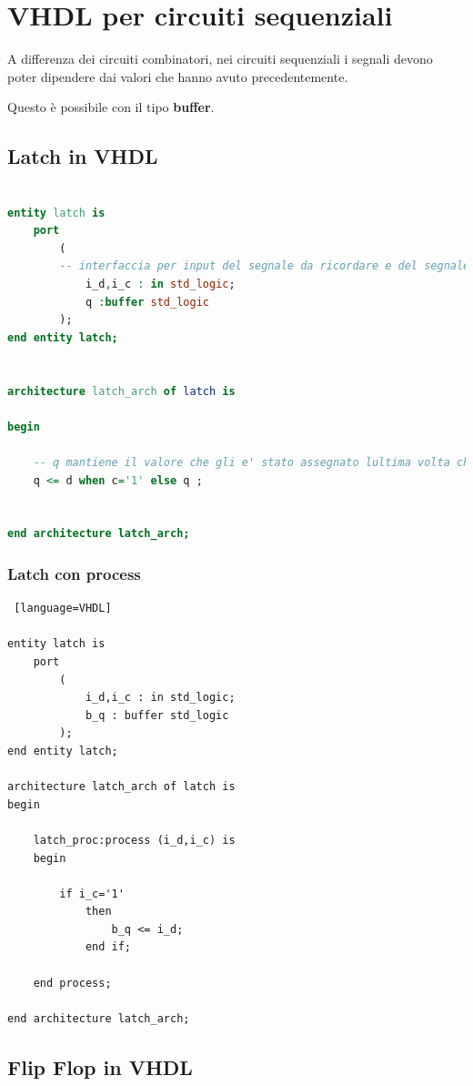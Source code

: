 \documentclass[a4paper]{book}
\begin{document}
\section{VHDL per circuiti sequenziali}

A differenza dei circuiti combinatori, nei circuiti sequenziali i segnali devono poter dipendere dai valori che hanno avuto precedentemente.

Questo è possibile con il tipo \textbf{buffer}.

\subsection*{Latch in VHDL}

\begin{lstlisting}[language=VHDL]

entity latch is
	port
		(
		-- interfaccia per input del segnale da ricordare e del segnale di clock
			i_d,i_c : in std_logic; 
			q :buffer std_logic
		);
end entity latch;


architecture latch_arch of latch is

begin
	
	-- q mantiene il valore che gli e' stato assegnato lultima volta che c e stato ad 1 finche non si presenta nuovamente ad 1
	q <= d when c='1' else q ; 
	
	
end architecture latch_arch;

\end{lstlisting}

\subsubsection*{Latch con process}
\begin{lstlisting} [language=VHDL]

entity latch is
    port
        (
            i_d,i_c : in std_logic;
            b_q : buffer std_logic
        );
end entity latch;

architecture latch_arch of latch is
begin

    latch_proc:process (i_d,i_c) is
    begin

        if i_c='1'
            then
                b_q <= i_d;
            end if;

    end process;

end architecture latch_arch;
\end{lstlisting}


\subsection*{Flip Flop in VHDL}
\end{document}
